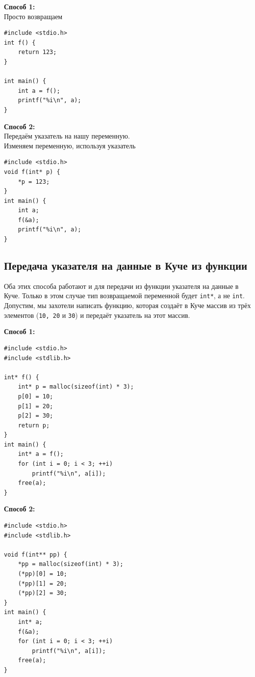 \documentclass{article}
\begin{document}
\begin{multicols}{2}
\textbf{Способ 1:}\\
Просто возвращаем
\begin{lstlisting}
#include <stdio.h>
int f() {
    return 123;
}

int main() {
    int a = f();
    printf("%i\n", a);
}
\end{lstlisting}

\columnbreak

\textbf{Способ 2:}\\
Передаём указатель на нашу переменную.\\
Изменяем переменную, используя указатель
\begin{lstlisting}
#include <stdio.h>
void f(int* p) {
    *p = 123;
}
int main() {
    int a;
    f(&a);
    printf("%i\n", a);
}
\end{lstlisting}
\end{multicols}


\subsection*{Передача указателя на данные в Куче из функции}
Оба этих способа работают и для передачи из функции указателя на данные в Куче. Только в этом случае тип возвращаемой переменной будет \texttt{int*}, а не \texttt{int}. Допустим, мы захотели написать функцию, которая создаёт в Куче массив из трёх элементов (\texttt{10, 20} и \texttt{30}) и передаёт указатель на этот массив.
\begin{multicols}{2}
\textbf{Способ 1:}
\begin{lstlisting}
#include <stdio.h>
#include <stdlib.h>

int* f() {
    int* p = malloc(sizeof(int) * 3);
    p[0] = 10;
    p[1] = 20;
    p[2] = 30;
    return p;
}
int main() {
    int* a = f();
    for (int i = 0; i < 3; ++i)
        printf("%i\n", a[i]);
    free(a);
}
\end{lstlisting}

\columnbreak

\textbf{Способ 2:}
\begin{lstlisting}
#include <stdio.h>
#include <stdlib.h>

void f(int** pp) {
    *pp = malloc(sizeof(int) * 3);
    (*pp)[0] = 10;
    (*pp)[1] = 20;
    (*pp)[2] = 30;
}
int main() {
    int* a;
    f(&a);
    for (int i = 0; i < 3; ++i)
        printf("%i\n", a[i]);
    free(a);
}
\end{lstlisting}
\end{multicols}
\end{document}
